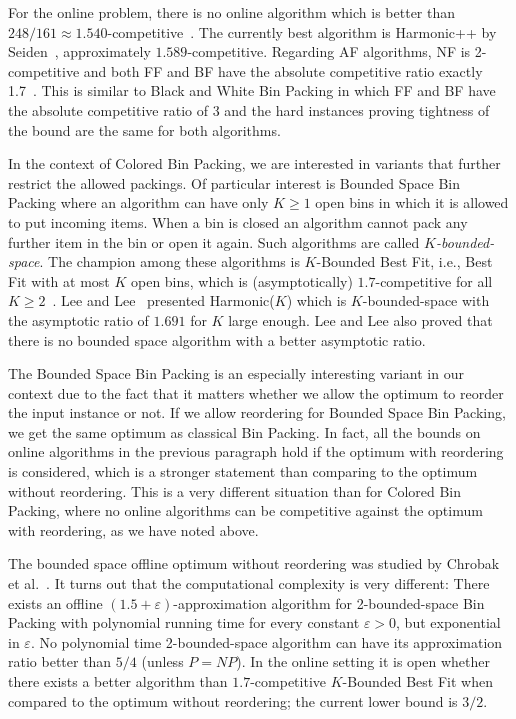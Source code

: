 \documentclass[11pt,a4paper]{article}
\begin{document}
For the online problem, there is no online algorithm which is better
than $248/161\approx 1.540$-competitive~\cite{balogh12}.  The
currently best algorithm is Harmonic++ by Seiden~\cite{seiden02},
approximately $1.589$-competitive.  Regarding AF algorithms, NF is
2-competitive and both FF and BF have the absolute competitive ratio
exactly 1.7~\cite{dosa13,dosa14}.  This is similar to Black and White
Bin Packing in which FF and BF have the absolute competitive ratio of 3
and the hard instances proving tightness of the bound are the same for
both algorithms.

In the context of Colored Bin Packing, we are interested in variants
that further restrict the allowed packings. Of particular interest is
Bounded Space Bin Packing where an algorithm can have only $K \geq 1$
open bins in which it is allowed to put incoming items.  When a bin is
closed an algorithm cannot pack any further item in the bin or open it
again.  Such algorithms are called \textit{$K$-bounded-space}. The
champion among these algorithms is $K$-Bounded Best Fit, i.e., Best
Fit with at most $K$ open bins, which is (asymptotically)
$1.7$-competitive for all $K \geq 2$~\cite{csirik01}.  Lee and
Lee~\cite{lee85} presented Harmonic($K$) which is $K$-bounded-space
with the asymptotic ratio of $1.691$ for $K$ large enough. Lee and Lee also
proved that there is no bounded space algorithm with a better asymptotic
ratio.

The Bounded Space Bin Packing is an especially interesting variant in
our context due to the fact that it matters whether we allow the
optimum to reorder the input instance or not. If we allow reordering
for Bounded Space Bin Packing, we get the same optimum as classical
Bin Packing. In fact, all the bounds on online algorithms in the
previous paragraph hold if the optimum with reordering is considered,
which is a stronger statement than comparing to the optimum without
reordering. This is a very different situation than for Colored Bin
Packing, where no online algorithms can be competitive against the
optimum with reordering, as we have noted above.

The bounded space offline optimum without reordering was studied by
Chro\-bak et al.~\cite{chrobak11}. It turns out that the computational
complexity is very different: There exists an offline
$(1.5+\varepsilon)$-approximation algorithm for 2-bounded-space Bin
Packing with polynomial running time for every constant
$\varepsilon>0$, but exponential in $\varepsilon$. No polynomial time
2-bounded-space algorithm can have its approximation ratio better than
$5/4$ (unless $P=NP$). In the online setting it is open whether there exists a
better algorithm than $1.7$-competitive $K$-Bounded Best Fit when
compared to the optimum without reordering; the current lower bound is
$3/2$.
\end{document}
